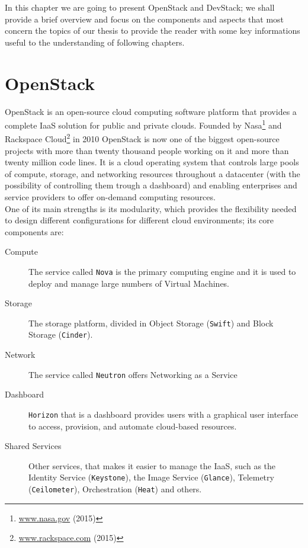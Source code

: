 

In this chapter we are going to present OpenStack and DevStack; we shall provide a brief overview and focus on the components and aspects that most concern the topics of our thesis to provide the reader with some key informations useful to the understanding of following chapters.

\section{OpenStack}
\label{sec:openstack}
OpenStack is an open-source cloud computing software platform that provides a complete IaaS solution for public and private clouds. Founded by Nasa\footnote{\url{www.nasa.gov} (2015)} and Rackspace Cloud\footnote{\url{www.rackspace.com} (2015)} in 2010 OpenStack is now one of the biggest open-source projects with more than twenty thousand people working on it and more than twenty million code lines. It is a cloud operating system that controls large pools of compute, storage, and networking resources throughout a datacenter (with the possibility of controlling them trough a dashboard) and enabling enterprises and service providers to offer on-demand computing resources.\\
One of its main strengths is its modularity, which provides the flexibility needed to design different configurations for different cloud environments; its core components are:
\begin{description}
	\item[Compute] The service called \texttt{Nova} is the primary computing engine and it is used to deploy and manage large numbers of Virtual Machines.
	\item[Storage] The storage platform, divided in Object Storage (\texttt{Swift}) and Block Storage (\texttt{Cinder}).
	\item[Network] The service called \texttt{Neutron} offers Networking as a Service
	\item[Dashboard] \texttt{Horizon} that is a dashboard provides users with a graphical user interface to access, provision, and automate cloud-based resources.
	\item[Shared Services] Other services, that makes it easier to manage the IaaS, such as the Identity Service (\texttt{Keystone}), the Image Service (\texttt{Glance}), Telemetry (\texttt{Ceilometer}), Orchestration (\texttt{Heat}) and others.
\end{description}

